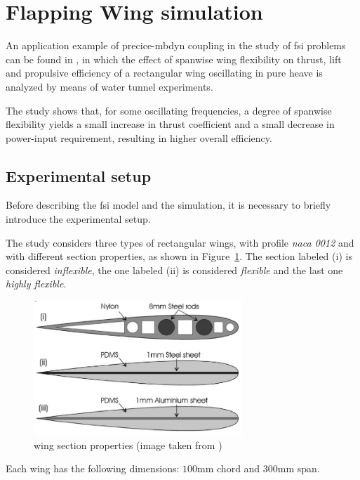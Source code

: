
\section{Flapping Wing simulation}

An application example of \acrshort{precice}-\acrshort{mbdyn} coupling in the study of \acrshort{fsi} problems can be found in \cite{heathcote2008effect}, in which the effect of spanwise wing flexibility on thrust, lift and propulsive efficiency of a rectangular wing oscillating in pure heave is analyzed by means of water tunnel experiments.

The study shows that, for some oscillating frequencies, a degree of spanwise flexibility yields a small
increase in thrust coefficient and a small decrease in power-input requirement, resulting in higher overall efficiency.

\subsection{Experimental setup}

Before describing the \acrshort{fsi} model and the simulation, it is necessary to briefly introduce the experimental setup.

The study considers three types of rectangular wings, with profile \textit{naca 0012} and with different section properties, as shown in Figure~\ref{fig:profiles0012}. The section labeled (i) is considered \textit{inflexible}, the one labeled (ii) is considered \textit{flexible} and the last one \textit{highly flexible}.

\begin{figure}[htbp!]
	\centering
	\includegraphics[width=0.7\textwidth]{images/profiles0012}
	\caption{wing section properties (image taken from \cite{heathcote2008effect})}
	\label{fig:profiles0012}
\end{figure}

Each wing has the following dimensions: $100$\si{mm} chord and $300$\si{mm} span.

